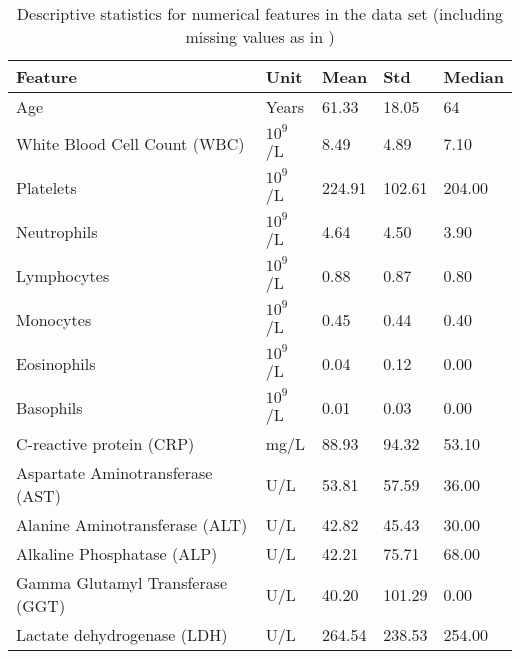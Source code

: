 \begin{table}
\centering
\begin{tabular}{lllll}
Feature                          & Unit                    & Mean   & Std    & 
Median \\ \hline
Age                              & Years                   & 61.33  & 18.05  & 
64     \\
White Blood Cell Count (WBC)     & $10^9$/L & 8.49   & 4.89   & 
7.10   \\
Platelets                        & $10^9$/L & 224.91  & 102.61  & 
204.00 \\
Neutrophils                      & $10^9$/L & 4.64   & 4.50   & 
3.90   \\
Lymphocytes                      & $10^9$/L & 0.88   & 0.87   & 
0.80   \\
Monocytes                        & $10^9$/L & 0.45   & 0.44   & 
0.40   \\
Eosinophils                      & $10^9$/L & 0.04   & 0.12   & 
0.00   \\
Basophils                        & $10^9$/L & 0.01   & 0.03   & 
0.00   \\
C-reactive protein (CRP)         & mg/L                    & 88.93  & 94.32  & 
53.10  \\
Aspartate Aminotransferase (AST) & U/L                     & 53.81  & 57.59  & 
36.00  \\
Alanine Aminotransferase (ALT)   & U/L                     & 42.82  & 45.43  & 
30.00  \\
Alkaline Phosphatase (ALP)       & U/L                     & 42.21  & 75.71  & 
68.00  \\
Gamma Glutamyl Transferase (GGT) & U/L                     & 40.20  & 101.29 & 
0.00  \\
Lactate dehydrogenase (LDH)      & U/L                     & 264.54 & 238.53 
& 254.00
\end{tabular}
\caption{Descriptive statistics for numerical features in the data set 
(including 
missing values as in \cite{RN127})}
\label{tab:feature-dist-NAN}
\end{table}
